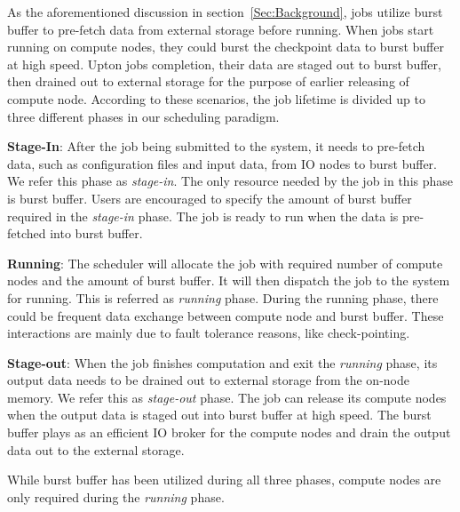 As the aforementioned discussion in section~\ref{Sec:Background},
jobs utilize burst buffer to pre-fetch data from external storage before running.
When jobs start running on compute nodes,
they could burst the checkpoint data to burst buffer at high speed.
Upton jobs completion, their data are staged out to burst buffer,
then drained out to external storage for the purpose of earlier releasing of compute node.
According to these scenarios,
the job lifetime is divided up to three different phases in our scheduling paradigm.

\textbf{Stage-In}: After the job being submitted to the system,
         it needs to pre-fetch data, such as configuration files and input data,
         from IO nodes to burst buffer. We refer this phase as \textit{stage-in}.
         The only resource needed by the job in this phase is burst buffer.
         Users are encouraged to specify the amount of burst buffer required in the \textit{stage-in} phase.
         The job is ready to run when the data is pre-fetched into burst buffer.
 
\textbf{Running}: The scheduler will allocate the job with required
         number of compute nodes and the amount of burst buffer. 
         It will then dispatch the job to the system for running.
         This is referred as \textit{running} phase.
         During the running phase, there could be frequent data exchange
         between compute node and burst buffer.
         These interactions are mainly due to fault tolerance reasons, like check-pointing. 
 
\textbf{Stage-out}: When the job finishes computation and
         exit the \textit{running} phase, its output data needs to be drained out
         to external storage from the on-node memory. We refer this as \textit{stage-out} phase.
         The job can release its compute nodes when the output data is staged out
         into burst buffer at high speed. The burst buffer plays as an efficient
         IO broker for the compute nodes and drain the output data out to the external storage.

While burst buffer has been utilized during all three phases,
compute nodes are only required during the \textit{running} phase. 


